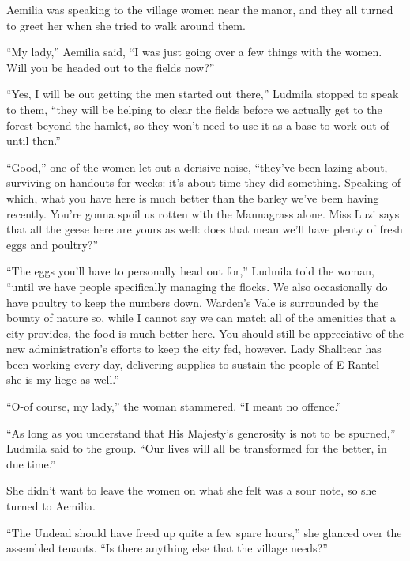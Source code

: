  

Aemilia was speaking to the village women near the manor, and they all turned to greet her when she tried to walk around them.

 

“My lady,” Aemilia said, “I was just going over a few things with the women. Will you be headed out to the fields now?”

 

“Yes, I will be out getting the men started out there,” Ludmila stopped to speak to them, “they will be helping to clear the fields before we actually get to the forest beyond the hamlet, so they won’t need to use it as a base to work out of until then.”

 

“Good,” one of the women let out a derisive noise, “they’ve been lazing about, surviving on handouts for weeks: it’s about time they did something. Speaking of which, what you have here is much better than the barley we’ve been having recently. You’re gonna spoil us rotten with the Mannagrass alone. Miss Luzi says that all the geese here are yours as well: does that mean we’ll have plenty of fresh eggs and poultry?”

 

“The eggs you’ll have to personally head out for,” Ludmila told the woman, “until we have people specifically managing the flocks. We also occasionally do have poultry to keep the numbers down. Warden’s Vale is surrounded by the bounty of nature so, while I cannot say we can match all of the amenities that a city provides, the food is much better here. You should still be appreciative of the new administration’s efforts to keep the city fed, however. Lady Shalltear has been working every day, delivering supplies to sustain the people of E-Rantel – she is my liege as well.”

 

“O-of course, my lady,” the woman stammered. “I meant no offence.”

 

“As long as you understand that His Majesty’s generosity is not to be spurned,” Ludmila said to the group. “Our lives will all be transformed for the better, in due time.”

 

She didn’t want to leave the women on what she felt was a sour note, so she turned to Aemilia.

 

“The Undead should have freed up quite a few spare hours,” she glanced over the assembled tenants. “Is there anything else that the village needs?”

